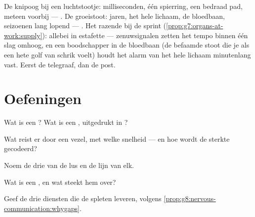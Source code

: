 \begin{example}\label{ex:g8:nervous-communication:cases}
De knipoog bij een luchtstootje: milliseconden, één spierring, een bedraad
pad, meteen voorbij --- . De groeistoot: jaren, het hele lichaam,
de bloedbaan, seizoenen lang lopend --- . Het razende  bij de
sprint (\cref{prop:g7:organs-at-work:supply}): allebei in estafette ---
zenuwsignalen zetten het tempo binnen één slag omhoog, en een boodschapper
in de bloedbaan (de befaamde stoot die je als een hete golf van schrik
voelt) houdt het alarm van het hele lichaam minutenlang vast. Eerst de
telegraaf, dan de post.
\end{example}

\section{Oefeningen}

\begin{exercise}[$\star$]\label{exo:g8:nervous-communication:1}
Wat is een ? Wat is een , uitgedrukt in ?
\end{exercise}

\begin{exercise}[$\star$]\label{exo:g8:nervous-communication:2}
Wat reist er door een vezel, met welke snelheid --- en hoe wordt de sterkte
gecodeerd?
\end{exercise}

\begin{exercise}[$\star$]\label{exo:g8:nervous-communication:3}
Noem de drie   van de lus en de lijn van elk.
\end{exercise}

\begin{exercise}[$\star$]\label{exo:g8:nervous-communication:4}
Wat is een , en wat steekt hem over?
\end{exercise}

\begin{exercise}[$\star$]\label{exo:g8:nervous-communication:5}
Geef de drie diensten die de spleten leveren, volgens
\cref{prop:g8:nervous-communication:whygaps}.
\end{exercise}

